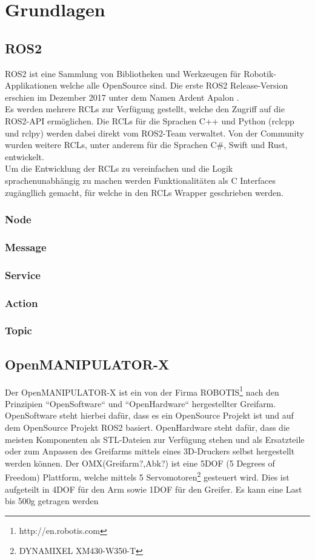 \section {Grundlagen}
\subsection{ROS2}
\ac{ROS2} ist eine Sammlung von Bibliotheken und Werkzeugen für Robotik-Applikationen welche alle OpenSource sind. Die erste \ac{ROS2} Release-Version erschien im Dezember 2017 unter dem Namen Ardent Apalon \citet{ros2docs}.\\
Es werden  mehrere \acp{RCL}  zur Verfügung gestellt, welche den Zugriff auf die \ac{ROS2}-API ermöglichen. Die \acp{RCL} für die Sprachen C++ und Python (rclcpp und rclpy) werden dabei direkt vom \ac{ROS2}-Team verwaltet. Von der Community wurden weitere \acp{RCL}, unter anderem für die Sprachen C\#, Swift und Rust, entwickelt.\\
Um die Entwicklung der \acp{RCL} zu vereinfachen und die Logik sprachenunabhängig zu machen werden Funktionalitäten als C Interfaces zugängllich gemacht, für welche in den \acp{RCL} Wrapper geschrieben werden.
\subsubsection{Node}
\subsubsection{Message}
\subsubsection{Service}
\subsubsection{Action}
\subsubsection{Topic}
\subsection{OpenMANIPULATOR-X}
Der OpenMANIPULATOR-X ist ein von der Firma ROBOTIS{\footnote{http://en.robotis.com}} nach den Prinzipien ``OpenSoftware`` und ``OpenHardware`` hergestellter Greifarm. OpenSoftware steht hierbei dafür, dass es ein OpenSource Projekt ist und auf dem OpenSource Projekt \ac{ROS2} basiert. OpenHardware steht dafür, dass die meisten Komponenten als STL-Dateien zur Verfügung stehen und als Ersatzteile oder zum Anpassen des Greifarms mittels eines 3D-Druckers selbst hergestellt werden können. \newline
Der OMX(Greifarm?,Abk?) ist eine 5DOF (5 Degrees of Freedom) Plattform, welche mittels 5 Servomotoren{\footnote{DYNAMIXEL XM430-W350-T}} gesteuert wird. Dies ist aufgeteilt in 4DOF für den Arm sowie 1DOF für den Greifer.
Es kann eine Last bis 500g getragen werden
